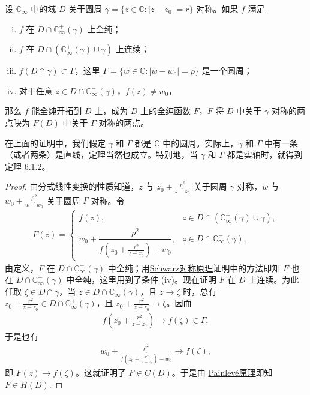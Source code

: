 \documentclass[../../main.tex]{subfiles}%
\begin{document}
\begin{theorem}[推广的Schwarz对称原理]\label{theorem:推广的Schwarz对称原理}
设 \(\mathbb{C}_{\infty}\) 中的域 \(D\) 关于圆周 \(\gamma = \{z \in \mathbb{C} : |z - z_0| = r\}\) 对称。如果 \(f\) 满足
\begin{enumerate}[(i)]
\item \(f\) 在 \(D \cap \mathbb{C}_{\infty}^+(\gamma)\) 上全纯；
\item \(f\) 在 \(D \cap (\mathbb{C}_{\infty}^+(\gamma) \cup \gamma)\) 上连续；
\item \(f(D \cap \gamma) \subset \Gamma\)，这里 \(\Gamma = \{w \in \mathbb{C} : |w - w_0| = \rho\}\) 是一个圆周；
\item 对于任意 \(z \in D \cap \mathbb{C}_{\infty}^+(\gamma)\)，\(f(z) \neq w_0\)，
\end{enumerate}
那么 \(f\) 能全纯开拓到 \(D\) 上，成为 \(D\) 上的全纯函数 \(F\)，\(F\) 将 \(D\) 中关于 \(\gamma\) 对称的两点映为 \(F(D)\) 中关于 \(\Gamma\) 对称的两点。
\end{theorem}
\begin{remark}
在上面的证明中，我们假定 \(\gamma\) 和 \(\Gamma\) 都是 \(\mathbb{C}\) 中的圆周。实际上，\(\gamma\) 和 \(\Gamma\) 中有一条（或者两条）是直线，定理当然也成立。特别地，当 \(\gamma\) 和 \(\Gamma\) 都是实轴时，就得到定理 6.1.2。
\end{remark}
\begin{proof}
由分式线性变换的性质知道，\(z\) 与 \(z_0 + \frac{r^2}{\overline{z - z_0}}\) 关于圆周 \(\gamma\) 对称，\(w\) 与 \(w_0 + \frac{\rho^2}{\overline{w - w_0}}\) 关于圆周 \(\Gamma\) 对称。令
\begin{align*}
F(z) = 
\begin{cases}
f(z), & z \in D \cap (\mathbb{C}_{\infty}^+(\gamma) \cup \gamma), \\
w_0 + \dfrac{\rho^2}{\overline{f\left(z_0 + \frac{r^2}{\overline{z - z_0}}\right) - w_0}}, & z \in D \cap \mathbb{C}_{\infty}^-(\gamma),
\end{cases}
\end{align*}
由定义，\(F\) 在 \(D \cap \mathbb{C}_{\infty}^+(\gamma)\) 中全纯；用\hyperref[theorem:Schwarz对称原理]{Schwarz对称原理}证明中的方法即知 \(F\) 也在 \(D \cap \mathbb{C}_{\infty}^-(\gamma)\) 中全纯，这里用到了条件 (iv)。现在证明 \(F\) 在 \(D\) 上连续。为此任取 \(\zeta \in D \cap \gamma\)，当 \(z \in D \cap \mathbb{C}_{\infty}^-(\gamma)\)，且 \(z \to \zeta\) 时，总有 \(z_0 + \frac{r^2}{\overline{z - z_0}} \in D \cap \mathbb{C}_{\infty}^+(\gamma)\)，且 \(z_0 + \frac{r^2}{\overline{z - z_0}} \to \zeta\)。因而
\begin{align*}
f\left(z_0 + \frac{r^2}{\overline{z - z_0}}\right) \to f(\zeta) \in \Gamma,
\end{align*}
于是也有
\begin{align*}
w_0 + \frac{\rho^2}{\overline{f\left(z_0 + \frac{r^2}{\overline{z - z_0}}\right) - w_0}} \to f(\zeta),
\end{align*}
即 \(F(z) \to f(\zeta)\)。这就证明了 \(F \in C(D)\)。于是由 \hyperref[theorem:Painlevé原理]{Painlevé原理}即知 \(F \in H(D)\).
\end{proof}
\end{document}
